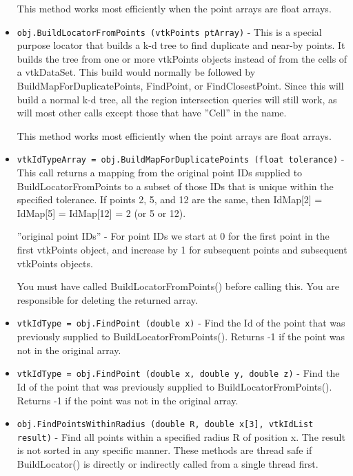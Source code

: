 \begin{itemize}
 This method works most efficiently when the point arrays are
 float arrays.

\item  \verb|obj.BuildLocatorFromPoints (vtkPoints ptArray)| -  This is a special purpose locator that builds a k-d tree to 
 find duplicate and near-by points.  It builds the tree from 
 one or more vtkPoints objects instead of from the cells of
 a vtkDataSet.  This build would normally be followed by
 BuildMapForDuplicatePoints, FindPoint, or FindClosestPoint.
 Since this will build a normal k-d tree, all the region intersection
 queries will still work, as will most other calls except those that
 have ''Cell'' in the name.

 This method works most efficiently when the point arrays are
 float arrays.

\item  \verb|vtkIdTypeArray = obj.BuildMapForDuplicatePoints (float tolerance)| -  This call returns a mapping from the original point IDs supplied
 to BuildLocatorFromPoints to a subset of those IDs that is unique 
 within the specified tolerance.  
 If points 2, 5, and 12 are the same, then 
 IdMap[2] = IdMap[5] = IdMap[12] = 2 (or 5 or 12).

 ''original point IDs'' - For point IDs we start at 0 for the first
 point in the first vtkPoints object, and increase by 1 for subsequent
 points and subsequent vtkPoints objects.

 You must have called BuildLocatorFromPoints() before calling this.
 You are responsible for deleting the returned array.

\item  \verb|vtkIdType = obj.FindPoint (double x)| -  Find the Id of the point that was previously supplied
 to BuildLocatorFromPoints().  Returns -1 if the point
 was not in the original array.

\item  \verb|vtkIdType = obj.FindPoint (double x, double y, double z)| -  Find the Id of the point that was previously supplied
 to BuildLocatorFromPoints().  Returns -1 if the point
 was not in the original array.

\item  \verb|obj.FindPointsWithinRadius (double R, double x[3], vtkIdList result)| -  Find all points within a specified radius R of position x.
 The result is not sorted in any specific manner.
 These methods are thread safe if BuildLocator() is directly or
 indirectly called from a single thread first.


\end{itemize}
